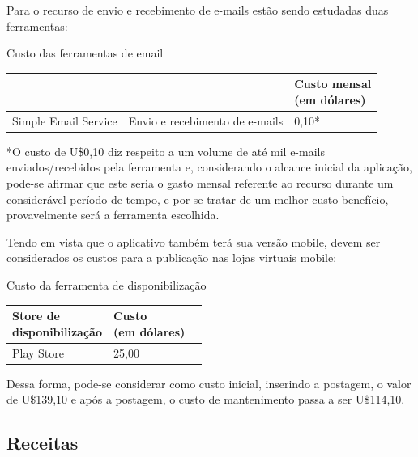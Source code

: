 Para o recurso de envio e recebimento de e-mails estão sendo estudadas duas ferramentas: 

\begin{quadro}[htb]
	\centering
	\ABNTEXfontereduzida
	\caption[Custo das ferramentas de email]{Custo das ferramentas de email}
	\label{quadro-exemplo}
	\begin{tabular}{|p{4.0cm}|p{4.0cm}|p{3.0cm}|}
		\hline
		\thead{Ferramenta} & \thead{Uso}  & \thead{Custo mensal\\(em dólares)} \\
		\hline
		Simple Email Service & Envio e recebimento de e-mails & 0,10*\\
		\hline
	\end{tabular}
\end{quadro}

*O custo de U\$0,10 diz respeito a um volume de até mil e-mails enviados/recebidos pela ferramenta e, considerando o alcance inicial da aplicação, pode-se afirmar que este seria o gasto mensal referente ao recurso durante um considerável período de tempo, e por se tratar de um melhor custo benefício, provavelmente será a ferramenta escolhida. 

Tendo em vista que o aplicativo também terá sua versão mobile, devem ser considerados os custos para a publicação nas lojas virtuais mobile: 

\begin{quadro}[htb]
	\centering
	\ABNTEXfontereduzida
	\caption[Custo da ferramenta de disponibilização]{Custo da ferramenta de disponibilização}
	\label{quadro-exemplo}
	\begin{tabular}{|p{4.0cm}|p{4.0cm}|p{3.0cm}|}
		\hline
		\thead{Store de\\ disponibilização} & \thead{Custo\\(em dólares)} \\
		\hline
		Play Store & 25,00 \\
		\hline
	\end{tabular}
\end{quadro}

Dessa forma, pode-se considerar como custo inicial, inserindo a postagem, o valor de U\$139,10 e após a postagem, o custo de mantenimento passa a ser U\$114,10.

\subsection{Receitas}

